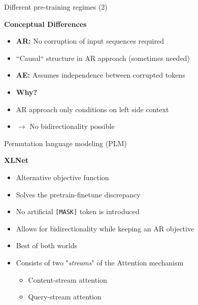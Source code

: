 \documentclass[11pt,compress,t,notes=noshow, xcolor=table]{beamer}
\begin{document}

\begin{frame}{Different pre-training regimes (2)}

\vfill
	
	\textbf{Conceptual Differences}
	
	\begin{itemize}
		\item \textbf{AR:} No corruption of input sequences required
		\item ``Causal`` structure in AR approach (sometimes needed)
		\item \textbf{AE:} Assumes independence between corrupted tokens
		\item[] \ques \textbf{Why?}
		\item AR approach only conditions on left side context
		\item[] $\to$ No bidirectionality possible
	\end{itemize}
	
\vfill

\end{frame}


\begin{frame}{Permutation language modeling (PLM)}

\vfill

	\textbf{XLNet} 
	
	\begin{itemize}
		\item Alternative objective function
		\item Solves the pretrain-finetune discrepancy
		\item[$\to$] No artificial \texttt{[MASK]} token is introduced
		\item Allows for bidirectionality while keeping an AR objective
		\item[$\to$] Best of both worlds
		\item Consists of two "\textit{streams}" of the Attention mechanism
				\begin{itemize}
					\item Content-stream attention
					\item Query-stream attention
				\end{itemize}
	\end{itemize}
	
\vfill

\end{frame}
\end{document}
